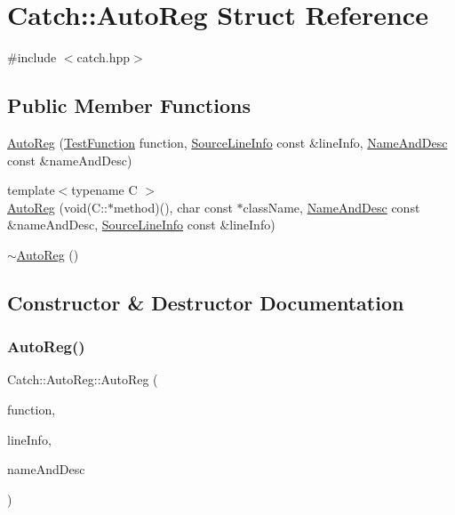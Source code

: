\hypertarget{struct_catch_1_1_auto_reg}{}\section{Catch\+:\+:Auto\+Reg Struct Reference}
\label{struct_catch_1_1_auto_reg}


{\ttfamily \#include $<$catch.\+hpp$>$}

\subsection*{Public Member Functions}
\begin{DoxyCompactItemize}
\item 
\hyperlink{struct_catch_1_1_auto_reg_af224f4568d57b8652474df475a164a8c}{Auto\+Reg} (\hyperlink{namespace_catch_a26414f52d0835939fae52aadd27e6257}{Test\+Function} function, \hyperlink{struct_catch_1_1_source_line_info}{Source\+Line\+Info} const \&line\+Info, \hyperlink{struct_catch_1_1_name_and_desc}{Name\+And\+Desc} const \&name\+And\+Desc)
\item 
{\footnotesize template$<$typename C $>$ }\\\hyperlink{struct_catch_1_1_auto_reg_a1bf9207fe0a02b46dc0ab1cc03cbe738}{Auto\+Reg} (void(C\+::$\ast$method)(), char const $\ast$class\+Name, \hyperlink{struct_catch_1_1_name_and_desc}{Name\+And\+Desc} const \&name\+And\+Desc, \hyperlink{struct_catch_1_1_source_line_info}{Source\+Line\+Info} const \&line\+Info)
\item 
\hyperlink{struct_catch_1_1_auto_reg_a3cdb53f1e5ff115310f3372bebe198f1}{$\sim$\+Auto\+Reg} ()
\end{DoxyCompactItemize}


\subsection{Constructor \& Destructor Documentation}
\hypertarget{struct_catch_1_1_auto_reg_af224f4568d57b8652474df475a164a8c}{}\label{struct_catch_1_1_auto_reg_af224f4568d57b8652474df475a164a8c} 
\subsubsection{\texorpdfstring{Auto\+Reg()}{AutoReg()}\hspace{0.1cm}{\footnotesize\ttfamily [1/2]}}
{\footnotesize\ttfamily Catch\+::\+Auto\+Reg\+::\+Auto\+Reg (\begin{DoxyParamCaption}\item[{\hyperlink{namespace_catch_a26414f52d0835939fae52aadd27e6257}{Test\+Function}}]{function,  }\item[{\hyperlink{struct_catch_1_1_source_line_info}{Source\+Line\+Info} const \&}]{line\+Info,  }\item[{\hyperlink{struct_catch_1_1_name_and_desc}{Name\+And\+Desc} const \&}]{name\+And\+Desc }\end{DoxyParamCaption})}

